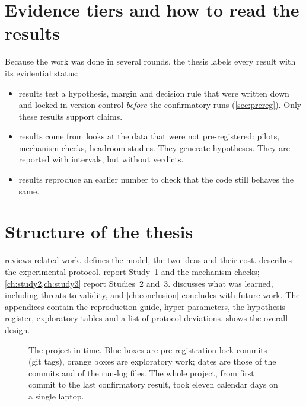 \section{Evidence tiers and how to read the results}
Because the work was done in several rounds, the thesis labels every result with its evidential status:
\begin{itemize}
\item \tierC{} results test a hypothesis, margin and decision rule that were written down and locked in version control \emph{before} the confirmatory runs (\cref{sec:prereg}). Only these results support claims.
\item \tierE{} results come from looks at the data that were not pre-registered: pilots, mechanism checks, headroom studies. They generate hypotheses. They are reported with intervals, but without verdicts.
\item \tierV{} results reproduce an earlier number to check that the code still behaves the same.
\end{itemize}

\section{Structure of the thesis}
 reviews related work.  defines the model, the two ideas and their cost.  describes the experimental protocol.  report Study~1 and the mechanism checks; \cref{ch:study2,ch:study3} report Studies~2 and~3.  discusses what was learned, including threats to validity, and \cref{ch:conclusion} concludes with future work. The appendices contain the reproduction guide, hyper-parameters, the hypothesis register, exploratory tables and a list of protocol deviations.  shows the overall design.

\begin{figure}[t]
\centering
\resizebox{\textwidth}{!}{}
\caption{The project in time. Blue boxes are pre-registration lock commits (git tags), orange boxes are exploratory work; dates are those of the commits and of the run-log files. The whole project, from first commit to the last confirmatory result, took eleven calendar days on a single laptop.}
\label{fig:overview}
\end{figure}
